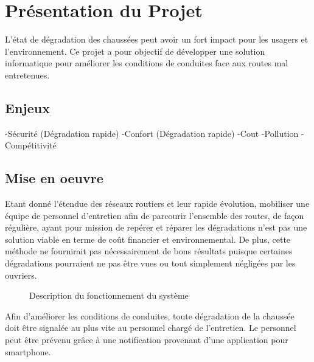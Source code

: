 \section{Présentation du Projet}
L'état de dégradation des chaussées peut avoir un fort impact pour les usagers
et l'environnement. Ce projet a pour objectif de développer une solution
informatique pour améliorer les conditions de conduites face aux routes mal
entretenues.

\subsection{Enjeux}

-Sécurité (Dégradation rapide)
-Confort (Dégradation rapide)
-Cout
-Pollution
-Compétitivité

\subsection{Mise en oeuvre}
Etant donné l'étendue des réseaux routiers et leur rapide évolution, mobiliser
une équipe de personnel d'entretien afin de parcourir l'ensemble des routes, de
façon régulière, ayant pour mission de repérer et réparer les dégradations
n'est pas une
solution viable en terme de coût financier et environnemental. De plus, cette
méthode ne fournirait pas nécessairement de bons résultats puisque certaines
dégradations pourraient ne pas être vues ou tout simplement négligées par les
ouvriers.\\

\begin{figure}[H]
    \centering
    \caption{Description du fonctionnement du système}
    \label{analyse}
\end{figure}

Afin d'améliorer les conditions de conduites, toute dégradation de la chaussée
doit être signalée au plus vite au personnel chargé de l'entretien. Le
personnel peut être prévenu grâce à une notification provenant d'une
application pour smartphone.\\

